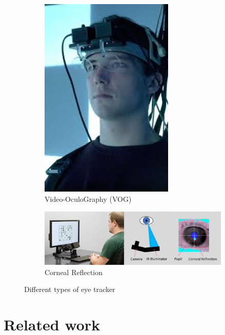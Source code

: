 \documentclass{article}
\begin{document}
\begin{figure}[ht]
    \vspace{0.5em}
    
    \begin{subfigure}[b]{0.45\textwidth}
        \centering
        \includegraphics[width=0.7\textwidth,height=0.6\textwidth]{Images/Theory/vog.jpeg}
        \caption{Video-OculoGraphy (VOG)}
        \label{fig:vog}
    \end{subfigure}
    \hfill
    \begin{subfigure}[b]{0.45\textwidth}
        \centering
        \includegraphics[width=1\textwidth,height=0.6\textwidth]{Images/Theory/corneal.jpg}
        \caption{Corneal Reflection}
        \label{fig:corneal}
    \end{subfigure}

    \caption{Different types of eye tracker}
    \label{fig:four_grid}
\end{figure}

\newpage
\section{Related work}
\end{document}
